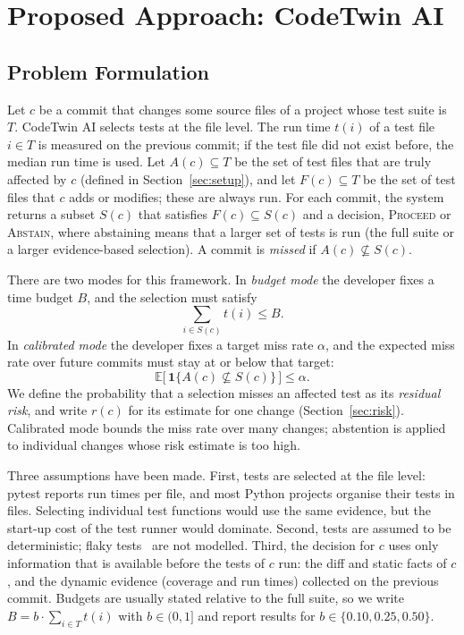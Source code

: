 \documentclass[conference]{IEEEtran}
\begin{document}
\section{Proposed Approach: CodeTwin AI}\label{sec:approach}

\subsection{Problem Formulation}
Let $c$ be a commit that changes some source files of a project whose test suite is $T$. CodeTwin AI selects tests at the file level. The run time $t(i)$ of a test file $i\in T$ is measured on the previous commit; if the test file did not exist before, the median run time is used. Let $A(c)\subseteq T$ be the set of test files that are truly affected by $c$ (defined in Section~\ref{sec:setup}), and let $F(c)\subseteq T$ be the set of test files that $c$ adds or modifies; these are always run. For each commit, the system returns a subset $S(c)$ that satisfies $F(c)\subseteq S(c)$ and a decision, \textsc{Proceed} or \textsc{Abstain}, where abstaining means that a larger set of tests is run (the full suite or a larger evidence-based selection). A commit is \emph{missed} if $A(c)\nsubseteq S(c)$.

There are two modes for this framework. In \emph{budget mode} the developer fixes a time budget $B$, and the selection must satisfy
\begin{equation}
\textstyle\sum_{i\in S(c)} t(i) \le B . \label{eq:budget}
\end{equation}
In \emph{calibrated mode} the developer fixes a target miss rate $\alpha$, and the expected miss rate over future commits must stay at or below that target:
\begin{equation}
\mathbb{E}\big[\,\mathbf{1}\{A(c)\nsubseteq S(c)\}\,\big] \le \alpha . \label{eq:risk}
\end{equation}
We define the probability that a selection misses an affected test as its \emph{residual risk}, and write $r(c)$ for its estimate for one change (Section~\ref{sec:risk}). Calibrated mode bounds the miss rate over many changes; abstention is applied to individual changes whose risk estimate is too high.

Three assumptions have been made. First, tests are selected at the file level: pytest reports run times per file, and most Python projects organise their tests in files. Selecting individual test functions would use the same evidence, but the start-up cost of the test runner would dominate. Second, tests are assumed to be deterministic; flaky tests~\cite{parry2022flaky} are not modelled. Third, the decision for $c$ uses only information that is available before the tests of $c$ run: the diff and static facts of $c$, and the dynamic evidence (coverage and run times) collected on the previous commit. Budgets are usually stated relative to the full suite, so we write $B=b\cdot\sum_{i\in T}t(i)$ with $b\in(0,1]$ and report results for $b\in\{0.10,0.25,0.50\}$.
\end{document}
